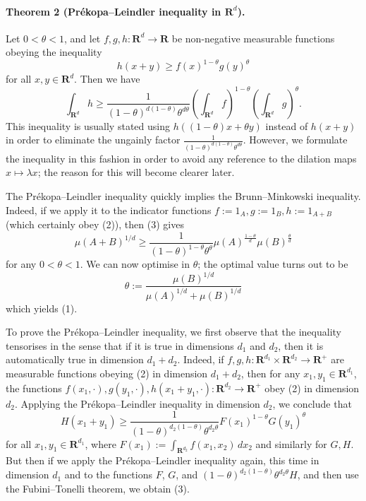 \documentclass[UTF8,11pt,a4paper]{ctexart}
\theoremstyle{definition}\newtheorem*{definition}{Definition}
\theoremstyle{remark}\newtheorem*{remark}{Remark}
\begin{document}
\paragraph{Theorem 2 (Pr\'ekopa--Leindler inequality in $\mathbf R^d$).}
Let $0<\theta<1$, and let $f,g,h:\mathbf R^d\to\mathbf R$ be non-negative measurable functions obeying the inequality
\begin{equation}
h(x+y)\geq f(x)^{1-\theta}g(y)^\theta\tag{2}
\end{equation}
for all $x,y\in\mathbf R^d$. Then we have
\begin{equation}
\int_{\mathbf R^d}h\geq
\frac{1}{(1-\theta)^{d(1-\theta)}\theta^{d\theta}}
\left(\int_{\mathbf R^d}f\right)^{1-\theta}
\left(\int_{\mathbf R^d}g\right)^\theta.\tag{3}
\end{equation}
This inequality is usually stated using $h((1-\theta)x+\theta y)$ instead of $h(x+y)$ in order to eliminate the ungainly factor $\frac{1}{(1-\theta)^{d(1-\theta)}\theta^{d\theta}}$. However, we formulate the inequality in this fashion in order to avoid any reference to the dilation maps $x\mapsto\lambda x$; the reason for this will become clearer later.

The Pr\'ekopa--Leindler inequality quickly implies the Brunn--Minkowski inequality. Indeed, if we apply it to the indicator functions $f:=1_A,g:=1_B,h:=1_{A+B}$ (which certainly obey (2)), then (3) gives
\[
\mu(A+B)^{1/d}\geq
\frac{1}{(1-\theta)^{1-\theta}\theta^\theta}
\mu(A)^{\frac{1-\theta}{d}}\mu(B)^{\frac{\theta}{d}}
\]
for any $0<\theta<1$. We can now optimise in $\theta$; the optimal value turns out to be
\[
\theta:=\frac{\mu(B)^{1/d}}{\mu(A)^{1/d}+\mu(B)^{1/d}}
\]
which yields (1).

To prove the Pr\'ekopa--Leindler inequality, we first observe that the inequality tensorises in the sense that if it is true in dimensions $d_1$ and $d_2$, then it is automatically true in dimension $d_1+d_2$. Indeed, if $f,g,h:\mathbf R^{d_1}\times\mathbf R^{d_2}\to\mathbf R^+$ are measurable functions obeying (2) in dimension $d_1+d_2$, then for any $x_1,y_1\in\mathbf R^{d_1}$, the functions $f(x_1,\cdot),g(y_1,\cdot),h(x_1+y_1,\cdot):\mathbf R^{d_2}\to\mathbf R^+$ obey (2) in dimension $d_2$. Applying the Pr\'ekopa--Leindler inequality in dimension $d_2$, we conclude that
\[
H(x_1+y_1)\geq
\frac{1}{(1-\theta)^{d_2(1-\theta)}\theta^{d_2\theta}}
F(x_1)^{1-\theta}G(y_1)^\theta
\]
for all $x_1,y_1\in\mathbf R^{d_1}$, where $F(x_1):=\int_{\mathbf R^{d_2}}f(x_1,x_2)\,dx_2$ and similarly for $G,H$. But then if we apply the Pr\'ekopa--Leindler inequality again, this time in dimension $d_1$ and to the functions $F$, $G$, and $(1-\theta)^{d_2(1-\theta)}\theta^{d_2\theta}H$, and then use the Fubini--Tonelli theorem, we obtain (3).
\end{document}
